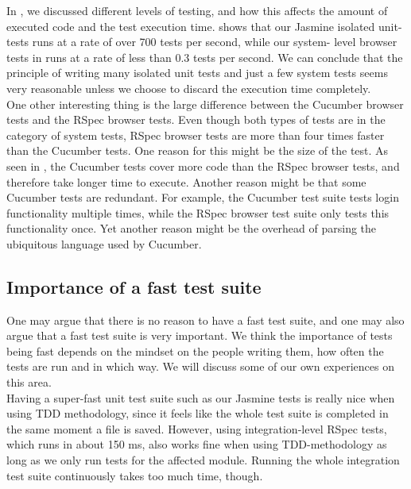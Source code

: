 In , we discussed different levels of testing,
and how this affects the amount of executed code and the test execution
time.  shows that our Jasmine isolated unit-
tests runs at a rate of over 700 tests per second, while our system-
level browser tests in  runs at a rate of
less than 0.3 tests per second. We can conclude that the principle of
writing many isolated unit tests and just a few system tests seems
very reasonable unless we choose to discard the execution time
completely.\\

One other interesting thing is the large difference between the Cucumber
browser tests and the RSpec browser tests. Even though both types of
tests are in the category of system tests, RSpec browser tests are
more than four times faster than the Cucumber tests. One reason for this
might be the size of the test. As seen in ,
the Cucumber tests cover more code than the RSpec browser tests, and
therefore take longer time to execute. Another reason might be that
some Cucumber tests are redundant. For example, the Cucumber test suite
tests login functionality multiple times, while the RSpec browser test
suite only tests this functionality once. Yet another reason might be
the overhead of parsing the ubiquitous language used by Cucumber.\\


\subsection{Importance of a fast test suite}

One may argue that there is no reason to have a fast test suite, and one
may also argue that a fast test suite is very important. We think the
importance of tests being fast depends on the mindset on the people
writing them, how often the tests are run and in which way. We will
discuss some of our own experiences on this area.\\

Having a super-fast unit test suite such as our Jasmine tests is really
nice when using TDD methodology, since it feels like the whole test
suite is completed in the same moment a file is saved. However, using
integration-level RSpec tests, which runs in about 150 ms, also works
fine when using TDD-methodology as long as we only run tests for the
affected module. Running the whole integration test suite continuously
takes too much time, though.\\

